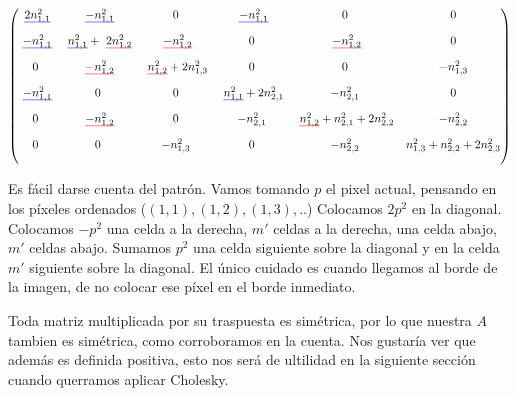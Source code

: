\setul{5pt}{2pt}
\[
\begin{pmatrix}
    \text{\setulcolor{blue} \ul{$2 n_{1,1}^{2}$}}  &  \text{\setulcolor{blue} \ul{$ -n_{1,1}^{2} $}}   &  0        & \text{\setulcolor{blue} \ul{$-n_{1,1}^{2} $}}   & 0         & 0            \\[10pt]

    \text{\setulcolor{blue} \ul{$-n_{1,1}^{2}$}} &  \text{\setulcolor{blue} \ul{$n_{1,1}^{2}$}} +                                \text{\setulcolor{red} \ul{$2 n_{1,2}^{2}$}}   &  \text{\setulcolor{red} \ul{$-n_{1,2}^{2}$}}        & 0     & \text{\setulcolor{red} \ul{$-n_{1,2}^{2}$}}         & 0            \\[10pt]

    0          &  \text{\setulcolor{red} \ul{$-n_{1,2}^{2}$}}  &  \text{\setulcolor{red} \ul{$n_{1,2}^{2}$}} + 2 n_{1,3}^{2} &   0   & 0  & -n_{1,3}^{2}            \\[10pt]

    \text{\setulcolor{blue} \ul{$-n_{1,1}^{2}$}} &  0            &  0           & \text{\setulcolor{blue} \ul{$n_{1,1}^{2}$}} + 2 n_{2,1}^{2} & -n_{2,1}^{2}    & 0            \\[10pt]

    0          &   \text{\setulcolor{red} \ul{$-n_{1,2}^{2}$}} & 0           & -n_{2,1}^{2}                & \text{\setulcolor{red} \ul{$n_{1,2}^{2}$}} + n_{2,1}^{2} + 2 n_{2,2}^{2}    &      -n_{2,2}^{2}  \\[10pt]

    0          &              0&  -n_{1,3}^{2} & 0                          & - n_{2,2}^{2} & n_{1,3}^{2} + n_{2,2}^{2} + 2 n_{2,3}^{2}             \\[10pt]

\end{pmatrix}
\]

Es fácil darse cuenta del patrón. Vamos tomando $p$ el pixel actual, pensando en los píxeles ordenados ($(1,1), (1,2), (1,3), .. $) Colocamos $2p^2$ en la diagonal. Colocamos $-p^2$ una celda a la derecha, $m'$ celdas a la derecha, una celda abajo, $m'$ celdas abajo. Sumamos $p^2$ una celda siguiente sobre la diagonal y en la celda $m'$ siguiente sobre la diagonal. El único cuidado es cuando llegamos al borde de la imagen, de no colocar ese píxel en el borde inmediato.

Toda matriz multiplicada por su traspuesta es simétrica, por lo que nuestra $A$ tambien es simétrica, como corroboramos en la cuenta. Nos gustaría ver que además es definida positiva, esto nos será de ultilidad en la siguiente sección cuando querramos aplicar Cholesky. \\

